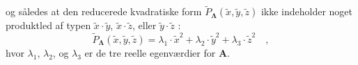 \begin{summary}
\begin{itemize}
    og således at den reducerede kvadratiske form $\widetilde{P}_{\bm{\Lambda}}(\widetilde{x}, \widetilde{y}, \widetilde{z})$ ikke indeholder noget produktled af typen $\widetilde{x}\cdot \widetilde{y}$, $\widetilde{x}\cdot \widetilde{z}$, eller $\widetilde{y}\cdot \widetilde{z} \,\,$:
\begin{equation}
\widetilde{P}_{\bm{\Lambda}}(\widetilde{x}, \widetilde{y}, \widetilde{z}) = \lambda_{1}\cdot \widetilde{x}^{2} +  \lambda_{2}\cdot \widetilde{y}^{2} +  \lambda_{3}\cdot \widetilde{z}^{2} \quad,
\end{equation}
hvor $\lambda_{1}$, $\lambda_{2}$, og $\lambda_{3}$ er de tre reelle egenværdier for $\mathbf{A}$.

\end{itemize}
\end{summary}






